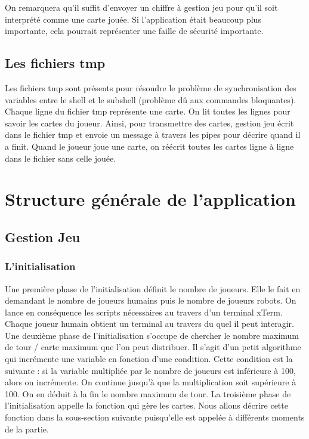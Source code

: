 \documentclass{article}
\begin{document}
\begin{itemize}
On remarquera qu'il suffit d'envoyer un chiffre à gestion jeu pour qu'il soit interprété comme une carte jouée. Si l'application était beaucoup plus importante, cela pourrait représenter une faille de sécurité importante. 
  
\end{itemize}

\newpage
\subsection{Les fichiers tmp}
Les fichiers tmp sont présents pour résoudre le problème de synchronisation des variables entre le shell et le subshell (problème dû aux commandes bloquantes). Chaque ligne du fichier tmp représente une carte. On lit toutes les lignes pour savoir les cartes du joueur. Ainsi, pour transmettre des cartes, gestion jeu écrit dans le fichier tmp et envoie un message à travers les pipes pour décrire quand il a finit. Quand le joueur joue une carte, on réécrit toutes les cartes ligne à ligne dans le fichier sans celle jouée.


\section{Structure générale de l'application}

\subsection{Gestion Jeu}
\subsubsection{L'initialisation}

Une première phase de l'initialisation définit le nombre de joueurs. Elle le fait en demandant le nombre de joueurs humains puis le nombre de joueurs robots. On lance en conséquence les scripts nécessaires au travers d'un terminal xTerm. Chaque joueur humain obtient un terminal au travers du quel il peut interagir.
\newline
\newline
Une deuxième phase de l'initialisation s'occupe de chercher le nombre maximum de tour / carte maximum que l'on peut distribuer. Il s'agit d'un petit algorithme qui incrémente une variable en fonction d'une condition. Cette condition est la suivante : si la variable multipliée par le nombre de joueurs est inférieure à 100, alors on incrémente. On continue jusqu'à que la multiplication soit supérieure à 100. On en déduit à la fin le nombre maximum de tour.
\newline
\newline
La troisième phase de l'initialisation appelle la fonction qui gère les cartes. Nous allons décrire cette fonction dans la sous-section suivante puisqu'elle est appelée à différents moments de la partie.  
\end{document}
